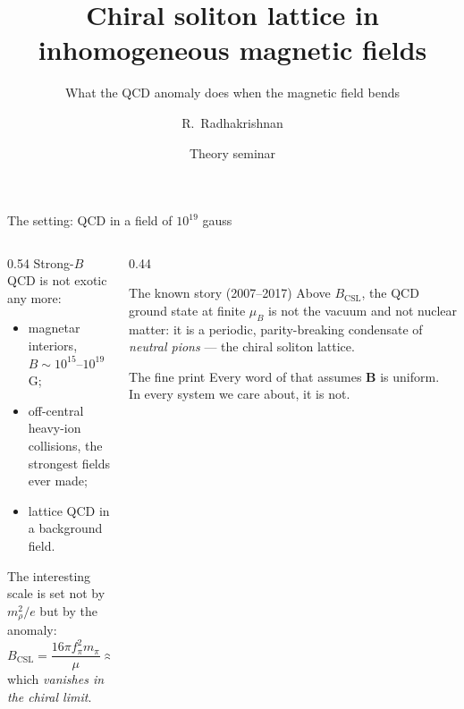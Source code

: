 \documentclass[aspectratio=169,10pt]{beamer}
\title{Chiral soliton lattice in inhomogeneous magnetic fields}
\subtitle{What the QCD anomaly does when the magnetic field bends}
\author{R.\ Radhakrishnan}     %
\institute{Department of Physics and Astronomy, North Carolina State University\\[2mm]
  \footnotesize with T.\ Brauner (Stavanger) \quad---\quad \texttt{arXiv:2608.27319}}
\date{Theory seminar}
\newcommand{\B}{\bm{B}}
\newcommand{\fpi}{f_\pi}
\newcommand{\mpi}{m_\pi}
\newcommand{\Bcsl}{B_{\mathrm{CSL}}}
\begin{document}
\maketitle

\begin{frame}{The setting: QCD in a field of $10^{19}$ gauss}
\begin{columns}[T,onlytextwidth]
\begin{column}{0.54\textwidth}
Strong-$B$ QCD is not exotic any more:
\begin{itemize}
  \item magnetar interiors, $B\sim10^{15}$--$10^{19}\,$G;
  \item off-central heavy-ion collisions, the strongest fields ever made;
  \item lattice QCD in a background field.
\end{itemize}
\vspace{2mm}
The interesting scale is set not by $m_\rho^2/e$ but by the \alert{anomaly}:
\[
  \Bcsl=\frac{16\pi \fpi^2\mpi}{\mu}\approx 0.06\,\text{GeV}^2\approx10^{19}\,\text{G}
\]
which \emph{vanishes in the chiral limit}.
\end{column}
\begin{column}{0.44\textwidth}
\begin{block}{The known story (2007--2017)}
Above $\Bcsl$, the QCD ground state at finite $\mu_B$ is not the vacuum and not
nuclear matter: it is a periodic, parity-breaking condensate of \emph{neutral
pions} --- the \alert{chiral soliton lattice}.
\end{block}
\vspace{2mm}
\begin{block}{The fine print}
Every word of that assumes $\B$ is \alert{uniform}. \\[1mm]
In every system we care about, it is not.
\end{block}
\end{column}
\end{columns}
\end{frame}
\end{document}
